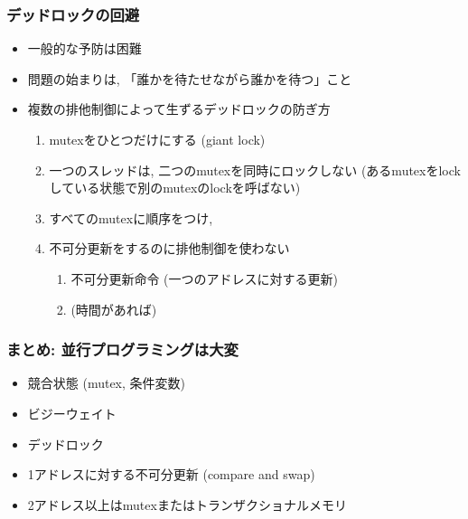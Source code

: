 \documentclass[12pt,dvipdfmx]{beamer}
\begin{document}
\begin{frame}
  \frametitle{デッドロックの回避}
  \begin{itemize}
  \item 一般的な予防は困難
  \item 問題の始まりは, 「誰かを待たせながら誰かを待つ」こと
  \item 複数の排他制御によって生ずるデッドロックの防ぎ方
    \begin{enumerate}
    \item mutexをひとつだけにする (giant lock)
    \item 一つのスレッドは,
      二つのmutexを同時にロックしない
      (あるmutexをlockしている状態で別のmutexのlockを呼ばない)
    \item すべてのmutexに順序をつけ,
    \item 不可分更新をするのに排他制御を使わない
      \begin{enumerate}
      \item 不可分更新命令 (一つのアドレスに対する更新)
      \item {} (時間があれば)
      \end{enumerate}
    \end{enumerate}
  \end{itemize}
\end{frame}

\begin{frame}
  \frametitle{まとめ: 並行プログラミングは大変}
  \begin{itemize}
  \item 競合状態 (mutex, 条件変数)
  \item ビジーウェイト
  \item デッドロック
  \item 1アドレスに対する不可分更新 (compare and swap)
  \item 2アドレス以上はmutexまたはトランザクショナルメモリ
  \end{itemize}
\end{frame}
\end{document}
